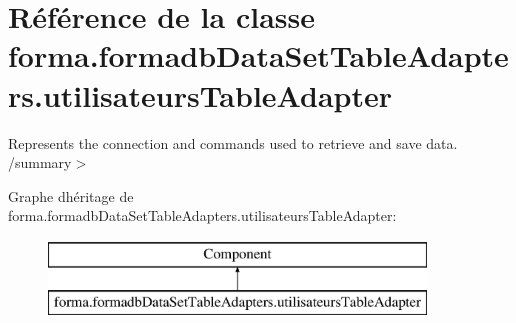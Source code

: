 \hypertarget{classforma_1_1formadb_data_set_table_adapters_1_1utilisateurs_table_adapter}{}\section{Référence de la classe forma.\+formadb\+Data\+Set\+Table\+Adapters.\+utilisateurs\+Table\+Adapter}
\label{classforma_1_1formadb_data_set_table_adapters_1_1utilisateurs_table_adapter}


Represents the connection and commands used to retrieve and save data. /summary$>$  


Graphe d\textquotesingle{}héritage de forma.\+formadb\+Data\+Set\+Table\+Adapters.\+utilisateurs\+Table\+Adapter\+:\begin{figure}[H]
\begin{center}
\leavevmode
\includegraphics[height=2.000000cm]{classforma_1_1formadb_data_set_table_adapters_1_1utilisateurs_table_adapter}
\end{center}
\end{figure}
